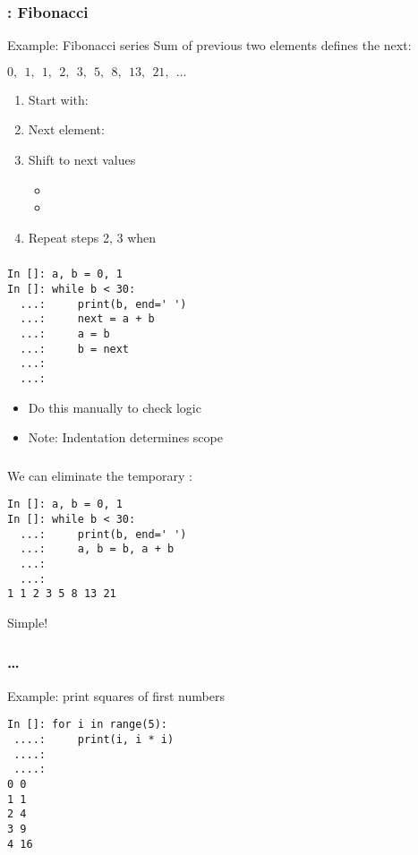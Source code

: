\documentclass[14pt,compress]{beamer}
\begin{document}
\begin{frame}[fragile]
  \frametitle{: Fibonacci}
\begin{block}{Example: Fibonacci series}
  Sum of previous two elements defines the next:
  \begin{center}
    $0,\ \ 1,\ \ 1,\ \ 2,\ \ 3,\ \ 5,\ \ 8,\ \ 13,\ \ 21,\ \ ...$
  \end{center}
\end{block}
\pause
\begin{enumerate}
\item Start with: 
  \pause
\item Next element: 
  \pause
\item Shift  to next values
  \begin{itemize}
  \item {}
  \item {}
  \end{itemize}
  \pause
\item Repeat steps 2, 3 when 
\end{enumerate}
\end{frame}


\begin{frame}[fragile]
  \frametitle{}
  \begin{lstlisting}
In []: a, b = 0, 1
In []: while b < 30:
  ...:     print(b, end=' ')
  ...:     next = a + b
  ...:     a = b
  ...:     b = next
  ...:
  ...:
\end{lstlisting}
  \begin{itemize}
  \item Do this manually to check logic
  \item Note: Indentation determines scope
  \end{itemize}
\end{frame}

\begin{frame}[fragile]
  \frametitle{}
  We can eliminate the temporary :
  \begin{lstlisting}
In []: a, b = 0, 1
In []: while b < 30:
  ...:     print(b, end=' ')
  ...:     a, b = b, a + b
  ...:
  ...:
1 1 2 3 5 8 13 21
\end{lstlisting}
  Simple!
\end{frame}


\begin{frame}[fragile]
  \frametitle{ \ldots {}}
Example: print squares of first  numbers
  \begin{lstlisting}
In []: for i in range(5):
 ....:     print(i, i * i)
 ....:
 ....:
0 0
1 1
2 4
3 9
4 16
\end{lstlisting}
\end{frame}
\end{document}
